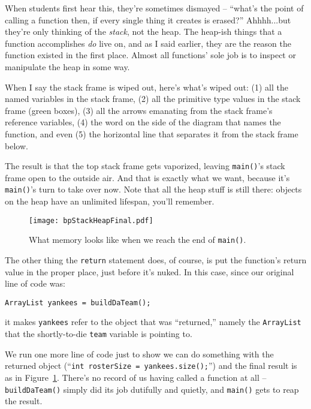 When students first hear this, they're sometimes dismayed -- ``what's the
point of calling a function then, if every single thing it creates is erased?''
Ahhhh...but they're only thinking of the \textit{stack}, not the heap. The
heap-ish things that a function accomplishes \textit{do} live on, and as I
said earlier, they are the reason the function existed in the first place.
Almost all functions' sole job is to inspect or manipulate the heap in some
way.

When I say the stack frame is wiped out, here's what's wiped out: (1) all the
named variables in the stack frame, (2) all the primitive type values in the
stack frame (green boxes), (3) all the arrows emanating from the stack frame's
reference variables, (4) the word on the side of the diagram that names the
function, and even (5) the horizontal line that separates it from the stack
frame below.

The result is that the top stack frame gets vaporized, leaving
\texttt{main()}'s stack frame open to the outside air. And that is exactly
what we want, because it's \texttt{main()}'s turn to take over now. Note that
all the heap stuff is still there: objects on the heap have an unlimited
lifespan, you'll remember.

\begin{figure}   %
\centering
\texttt{[image: bpStackHeapFinal.pdf]}
\caption{What memory looks like when we reach the end of \texttt{main()}.}
\label{fig:bpStackHeapFinal}
\end{figure}

The other thing the \texttt{return} statement does, of course, is put the
function's return value in the proper place, just before it's nuked. In this
case, since our original line of code was:

\begin{Verbatim}[fontsize=\scriptsize,samepage=true,frame=single]
        ArrayList yankees = buildDaTeam();
\end{Verbatim}

it makes \texttt{yankees} refer to the object that was ``returned,'' namely the
\texttt{ArrayList} that the shortly-to-die \texttt{team} variable is pointing
to.

We run one more line of code just to show we can do something with the
returned object (``\texttt{int rosterSize = yankees.size();}'') and the final
result is as in Figure~\ref{fig:bpStackHeapFinal}. There's no record of us
having called a function at all -- \texttt{buildDaTeam()} simply did its job
dutifully and quietly, and \texttt{main()} gets to reap the result.

